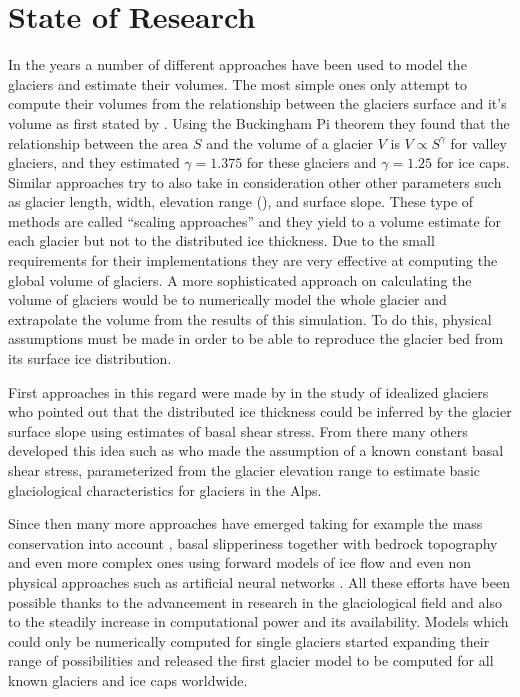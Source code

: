 \section{State of Research}\label{research}
In the years a number of different approaches have been used to model the glaciers and estimate their volumes.
The most simple ones only attempt to compute their volumes from the relationship between the glaciers surface and it's volume as first stated by \citet{bahr1997}. Using the Buckingham Pi
theorem they found that the relationship between the area $S$ and the volume of a glacier $V$ is $V \propto S^{\gamma}$ for valley glaciers, and they estimated $\gamma=1.375$ for these glaciers and $\gamma=1.25$ for ice caps. Similar approaches try to also take in consideration other other parameters such as glacier length, width, elevation range (\cite{Grinsted2013}), and surface slope. These type of methods are called ``scaling approaches'' and they yield to a volume estimate for each glacier but not to the distributed ice thickness. Due to the small requirements for their implementations they are very effective at computing the global volume of glaciers.
A more sophisticated approach on calculating the volume of glaciers would be to numerically model the whole glacier and extrapolate the volume from the results of this simulation. To do this, physical assumptions must be made in order to be able to reproduce the glacier bed from its surface ice distribution.

First approaches in this regard were made by \citet{Nye1965} in the study of  idealized glaciers who pointed out that the distributed ice thickness could be inferred by the glacier surface slope using estimates of basal shear stress. From there many others developed this idea such as \citet{haeberli1995} who made the assumption of a known constant basal shear stress, parameterized from the glacier elevation range to estimate basic glaciological characteristics for glaciers in the Alps. 

Since then many more approaches have emerged taking for example the mass conservation into account \cite{rasmussen_1988}, basal slipperiness together with bedrock topography \cite{Gudmundsson2001} and even more complex ones using forward models of ice flow \cite{vanPelt2013} and even non physical approaches such as artificial neural networks \cite{Clarke2009}. All these efforts have been possible thanks to the advancement in research in the glaciological field and also to the steadily increase in computational power and its availability. Models which could only be numerically computed for single glaciers started expanding their range of possibilities and \citet{Huss2012} released the first glacier model to be computed for all known glaciers and ice caps worldwide.

